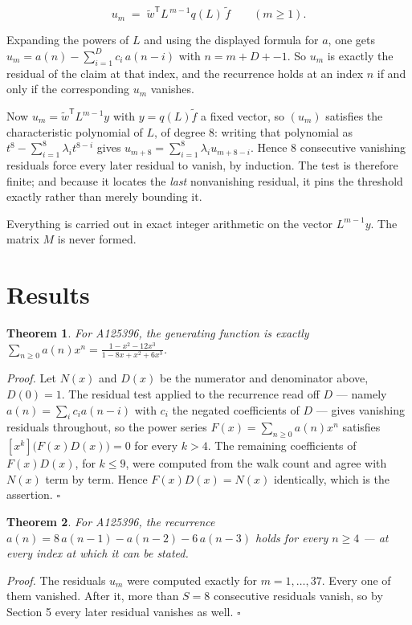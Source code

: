 \documentclass[11pt]{article}
\newtheorem{theorem}{Theorem}
\theoremstyle{definition}
\begin{document}
\[u_m \;=\; \tilde w^{\mathsf T} L^{\,m-1} q(L)\,\tilde f \qquad (m \ge 1).\]

Expanding the powers of $L$ and using the displayed formula for $a$, one gets $u_m = a(n) - \sum_{i=1}^{D} c_i\,a(n-i)$ with $n = m + D + -1$. So $u_m$ is exactly the residual of the claim at that index, and the recurrence holds at an index $n$ if and only if the corresponding $u_m$ vanishes.

Now $u_m = \tilde w^{\mathsf T} L^{m-1} y$ with $y = q(L)\tilde f$ a fixed vector, so $(u_m)$ satisfies the characteristic polynomial of $L$, of degree $8$: writing that polynomial as $t^{8} - \sum_{i=1}^{8} \lambda_i t^{8-i}$ gives $u_{m+8} = \sum_{i=1}^{8} \lambda_i u_{m+8-i}$. Hence $8$ consecutive vanishing residuals force every later residual to vanish, by induction. The test is therefore finite; and because it locates the {\itshape last} nonvanishing residual, it pins the threshold exactly rather than merely bounding it.

Everything is carried out in exact integer arithmetic on the vector $L^{m-1}y$. The matrix $M$ is never formed.

\section{Results}

\begin{theorem} For A125396, the generating function is exactly $\sum_{n\ge 0} a(n)x^n = \frac{1 - x^{2} - 12x^{3}}{1 - 8x + x^{2} + 6x^{3}}$.\end{theorem}

{\itshape Proof.} Let $N(x)$ and $D(x)$ be the numerator and denominator above, $D(0)=1$. The residual test applied to the recurrence read off $D$ --- namely $a(n) = \sum_i c_i a(n-i)$ with $c_i$ the negated coefficients of $D$ --- gives vanishing residuals throughout, so the power series $F(x)=\sum_{n\ge 0}a(n)x^n$ satisfies $[x^k]\bigl(F(x)D(x)\bigr) = 0$ for every $k > 4$. The remaining coefficients of $F(x)D(x)$, for $k \le 9$, were computed from the walk count and agree with $N(x)$ term by term. Hence $F(x)D(x) = N(x)$ identically, which is the assertion. $\square$

\begin{theorem} For A125396, the recurrence $a(n) = 8\,a(n-1) - a(n-2) - 6\,a(n-3)$ holds for every $n \ge 4$ --- at every index at which it can be stated.\end{theorem}

{\itshape Proof.} The residuals $u_m$ were computed exactly for $m = 1,\dots,37$. Every one of them vanished. After it, more than $S = 8$ consecutive residuals vanish, so by Section 5 every later residual vanishes as well. $\square$
\end{document}

